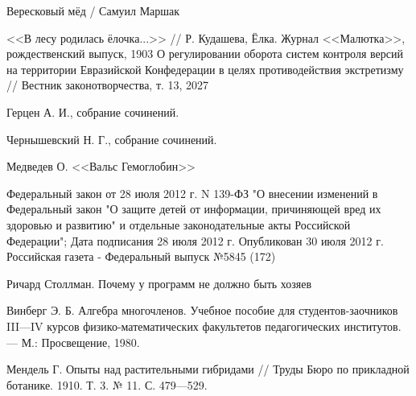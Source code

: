 \begin{thebibliography}{99}

 Вересковый мёд / Самуил Маршак

 <<В лесу родилась ёлочка...>> // Р. Кудашева, Ёлка. Журнал <<Малютка>>, рождественский выпуск, 1903
О регулировании оборота систем контроля версий на территории Евразийской Конфедерации в целях противодействия экстретизму
// Вестник законотворчества, т. 13, 2027

 Герцен А. И., собрание сочинений.

 Чернышевский Н. Г., собрание сочинений.

 Медведев О. <<Вальс Гемоглобин>>

  Федеральный закон от 28 июля 2012 г. N 139-ФЗ "О внесении изменений в Федеральный закон "О защите детей от информации, причиняющей вред их здоровью и развитию" и отдельные законодательные акты Российской Федерации"; Дата подписания 28 июля 2012 г. Опубликован 30 июля 2012 г. Российская газета - Федеральный выпуск №5845 (172)

 Ричард Столлман. Почему у программ не должно быть хозяев

 Винберг Э. Б. Алгебра многочленов. Учебное пособие для студентов-заочников III—IV курсов физико-математических факультетов педагогических институтов. — М.: Просвещение, 1980.

 Мендель Г. Опыты над растительными гибридами // Труды Бюро по прикладной ботанике. 1910. Т. 3. № 11. С. 479—529.

\end{thebibliography}

